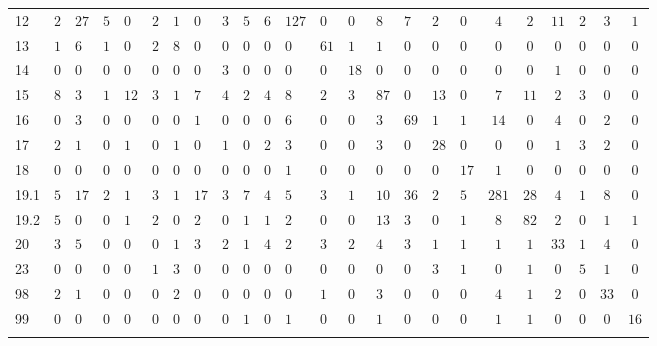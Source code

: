 \begin{table}[!htbp]
\begin{tabularx}{\textwidth}{XXXXXXXXXXXXXXXXXXcccccc}
12 & $2$ & $27$ & $5$ & $0$ & $2$ & $1$ & $0$ & $3$ & $5$ & $6$ & $127$ & $0$ & $0$ & $8$ & $7$ & $2$ & $0$ & $4$ & $2$ & $11$ & $2$ & $3$ & $1$ \\ 
13 & $1$ & $6$ & $1$ & $0$ & $2$ & $8$ & $0$ & $0$ & $0$ & $0$ & $0$ & $61$ & $1$ & $1$ & $0$ & $0$ & $0$ & $0$ & $0$ & $0$ & $0$ & $0$ & $0$ \\ 
14 & $0$ & $0$ & $0$ & $0$ & $0$ & $0$ & $0$ & $3$ & $0$ & $0$ & $0$ & $0$ & $18$ & $0$ & $0$ & $0$ & $0$ & $0$ & $0$ & $1$ & $0$ & $0$ & $0$ \\ 
15 & $8$ & $3$ & $1$ & $12$ & $3$ & $1$ & $7$ & $4$ & $2$ & $4$ & $8$ & $2$ & $3$ & $87$ & $0$ & $13$ & $0$ & $7$ & $11$ & $2$ & $3$ & $0$ & $0$ \\ 
16 & $0$ & $3$ & $0$ & $0$ & $0$ & $0$ & $1$ & $0$ & $0$ & $0$ & $6$ & $0$ & $0$ & $3$ & $69$ & $1$ & $1$ & $14$ & $0$ & $4$ & $0$ & $2$ & $0$ \\ 
17 & $2$ & $1$ & $0$ & $1$ & $0$ & $1$ & $0$ & $1$ & $0$ & $2$ & $3$ & $0$ & $0$ & $3$ & $0$ & $28$ & $0$ & $0$ & $0$ & $1$ & $3$ & $2$ & $0$ \\ 
18 & $0$ & $0$ & $0$ & $0$ & $0$ & $0$ & $0$ & $0$ & $0$ & $0$ & $1$ & $0$ & $0$ & $0$ & $0$ & $0$ & $17$ & $1$ & $0$ & $0$ & $0$ & $0$ & $0$ \\ 
19.1 & $5$ & $17$ & $2$ & $1$ & $3$ & $1$ & $17$ & $3$ & $7$ & $4$ & $5$ & $3$ & $1$ & $10$ & $36$ & $2$ & $5$ & $281$ & $28$ & $4$ & $1$ & $8$ & $0$ \\ 
19.2 & $5$ & $0$ & $0$ & $1$ & $2$ & $0$ & $2$ & $0$ & $1$ & $1$ & $2$ & $0$ & $0$ & $13$ & $3$ & $0$ & $1$ & $8$ & $82$ & $2$ & $0$ & $1$ & $1$ \\ 
20 & $3$ & $5$ & $0$ & $0$ & $0$ & $1$ & $3$ & $2$ & $1$ & $4$ & $2$ & $3$ & $2$ & $4$ & $3$ & $1$ & $1$ & $1$ & $1$ & $33$ & $1$ & $4$ & $0$ \\ 
23 & $0$ & $0$ & $0$ & $0$ & $1$ & $3$ & $0$ & $0$ & $0$ & $0$ & $0$ & $0$ & $0$ & $0$ & $0$ & $3$ & $1$ & $0$ & $1$ & $0$ & $5$ & $1$ & $0$ \\ 
98 & $2$ & $1$ & $0$ & $0$ & $0$ & $2$ & $0$ & $0$ & $0$ & $0$ & $0$ & $1$ & $0$ & $3$ & $0$ & $0$ & $0$ & $4$ & $1$ & $2$ & $0$ & $33$ & $0$ \\ 
99 & $0$ & $0$ & $0$ & $0$ & $0$ & $0$ & $0$ & $0$ & $1$ & $0$ & $1$ & $0$ & $0$ & $1$ & $0$ & $0$ & $0$ & $1$ & $1$ & $0$ & $0$ & $0$ & $16$ \\ 
\hline \\[-1.8ex] 
\end{tabularx} 
\end{table} 

